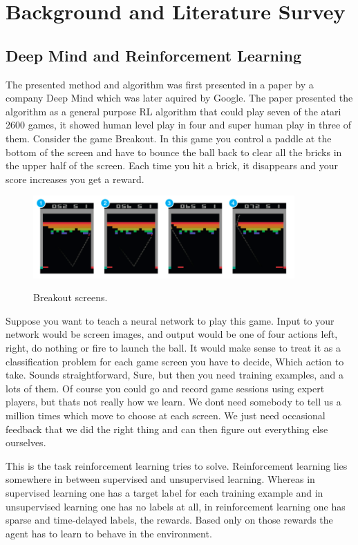 \documentclass[a4paper,11pt]{report}
\begin{document}
	\chapter{Background and Literature Survey}
		\section{Deep Mind and Reinforcement Learning}

			The presented method and algorithm was first presented in a paper by a company Deep Mind which was later aquired by Google. The paper presented the algorithm as a general purpose RL algorithm that could play seven of the atari 2600 games, it showed human level play in four and super human play in three of them.
			Consider the game Breakout. In this game you control a paddle at the bottom of the screen and have to bounce the ball back to clear all the bricks in the upper half of the screen. Each time you hit a brick, it disappears and your score increases you get a reward.

			\begin{figure}[!ht]
				\begin{centering}
					\includegraphics[width=10cm]{../Design/images/breakout.png}\\
					\caption{Breakout screens.}
				\end{centering}
			\end{figure}
			Suppose you want to teach a neural network to play this game. Input to your network would be screen images, and output would be one of four actions left, right, do nothing or fire to launch the ball. It would make sense to treat it as a classification problem for each game screen you have to decide, Which action to take. Sounds straightforward, Sure, but then you need training examples, and a lots of them. Of course you could go and record game sessions using expert players, but thats not really how we learn. We dont need somebody to tell us a million times which move to choose at each screen. We just need occasional feedback that we did the right thing and can then figure out everything else ourselves.

			This is the task reinforcement learning tries to solve. Reinforcement learning lies somewhere in between supervised and unsupervised learning. Whereas in supervised learning one has a target label for each training example and in unsupervised learning one has no labels at all, in reinforcement learning one has sparse and time-delayed labels, the rewards. Based only on those rewards the agent has to learn to behave in the environment.
\end{document}
